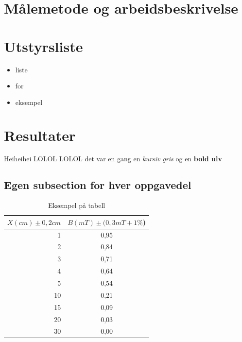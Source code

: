 \documentclass[12pt,norsk,a4paper]{article}
\begin{document}
\clearpage

\section{Målemetode og arbeidsbeskrivelse}
\clearpage


\section{Utstyrsliste} 
    \begin{itemize} %
    \item liste     %
    \item for
    \item eksempel
    \end{itemize}
\clearpage


\section{Resultater}

Heiheihei
LOLOL
LOLOL
det var en gang en \textit{kursiv gris} og en  \textbf{bold ulv}
\subsection{Egen subsection for hver oppgavedel}


\begin{table}[H] %
\begin{center}
	\begin{tabular}{ | r | c |} %
	\hline
	$X(cm )\pm0,2cm$  &$B(mT)\pm(0,3mT+1\%$) \\ \hline %
    1 & 0,95\\ \hline   %
    2 & 0,84\\ \hline
    3 & 0,71\\ \hline
    4 & 0,64\\ \hline
    5 & 0,54\\ \hline
    10 & 0,21\\ \hline
    15 & 0,09\\ \hline
    20 & 0,03\\ \hline
    30 & 0,00\\ \hline
    \hline
    \end{tabular}
    \end{center}
    \caption{Eksempel på tabell}

\end{table}
\clearpage
\end{document}
